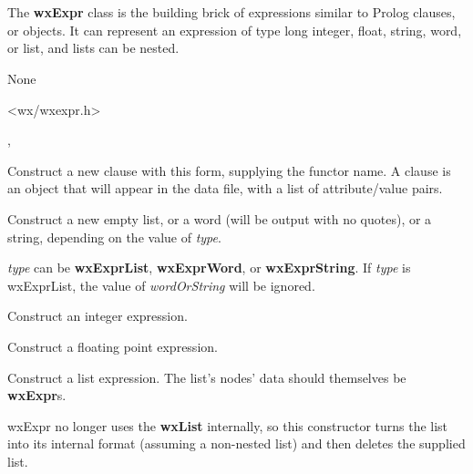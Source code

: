 \section{}\label{wxexpr}

The {\bf wxExpr} class is the building brick of expressions similar to Prolog
clauses, or objects. It can represent an expression of type long integer, float, string, word,
or list, and lists can be nested.


None


<wx/wxexpr.h>


, 


\label{wxexprconstr}


Construct a new clause with this form, supplying the functor name. A clause is an object
that will appear in the data file, with a list of attribute/value pairs.


Construct a new empty list, or a word (will be output with no quotes), or a string, depending on the
value of {\it type}.

{\it type} can be {\bf wxExprList}, {\bf wxExprWord}, or {\bf wxExprString}. If {\it type} is wxExprList,
the value of {\it wordOrString} will be ignored.


Construct an integer expression.


Construct a floating point expression.


Construct a list expression. The list's nodes' data should
themselves be {\bf wxExpr}s.

wxExpr no longer uses the {\bf wxList} internally,
so this constructor turns the list into its internal
format (assuming a non-nested list) and then deletes the supplied
list.

